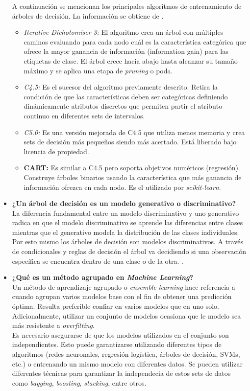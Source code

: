 \begin{itemize}
    A continuación se mencionan los principales algoritmos de entrenamiento de árboles de decisión. La información se obtiene de \cite{Sklearn-DT}.
    \begin{itemize}
        \item \textit{Iterative Dichotomiser 3:} El algoritmo crea un árbol con múltiples caminos evaluando para cada nodo cuál es la característica categórica que ofrece la mayor ganancia de información (information gain) para las etiquetas de clase. El árbol crece hacia abajo hasta alcanzar su tamaño máximo y se aplica una etapa de \textit{pruning} o poda. 
        \item \textit{C4.5:} Es el sucesor del algoritmo previamente descrito. Retira la condición de que las características deben ser categóricas definiendo dinámicamente atributos discretos que permiten partir el atributo continuo en diferentes sets de intervalos.
        \item \textit{C5.0:} Es una versión mejorada de C4.5 que utiliza menos memoria y crea sets de decisión más pequeños siendo más acertado. Está liberado bajo licencia de propiedad.
        \item \textbf{\textbf{CART:}} Es similar a C4.5 pero soporta objetivos numéricos (regresión). Construye árboles binarios usando la característica que más ganancia de información ofrezca en cada nodo. Es el utilizado por \textit{scikit-learn}.
    \end{itemize}
    \item \textbf{¿Un árbol de decisión es un modelo generativo o discriminativo?}\\
    
    La diferencia fundamental entre un modelo discriminativo y uno generativo radica en que el modelo discriminativo se aprende las diferencias entre clases mientras que el generativo modela la distribución de las clases individuales. Por esto mismo los árboles de decisión son modelos discriminativos. A través de condicionales y reglas de decisión el árbol va decidiendo si una observación específica se encuentra dentro de una clase o de la otra. \cite{DvsG}.
    
    \item \textbf{¿Qué es un método agrupado en \textit{Machine Learning}?}\\
    
    Un método de aprendizaje agrupado o \textit{ensemble learning} hace referencia a cuando agrupan varios modelos base con el fin de obtener una predicción óptima. Resulta preferible confiar en varios modelos que en uno solo. Adicionalmente, utilizar un conjunto de modelos ocasiona que le modelo sea más resistente a \textit{overfitting}.\\
    Es necesario asegurarse de que los modelos utilizados en el conjunto son independientes. Esto puede garantizarse utilizando diferentes tipos de algoritmos (redes neuronales, regresión logística, árboles de decisión, SVMs, etc.) o entrenando un mismo modelo con diferentes datos. Se pueden utilizar diferentes técnicas para garantizar la independecia de estos sets de datos como \textit{bagging}, \textit{boosting}, \textit{stacking}, entre otros.  
    

\end{itemize}
